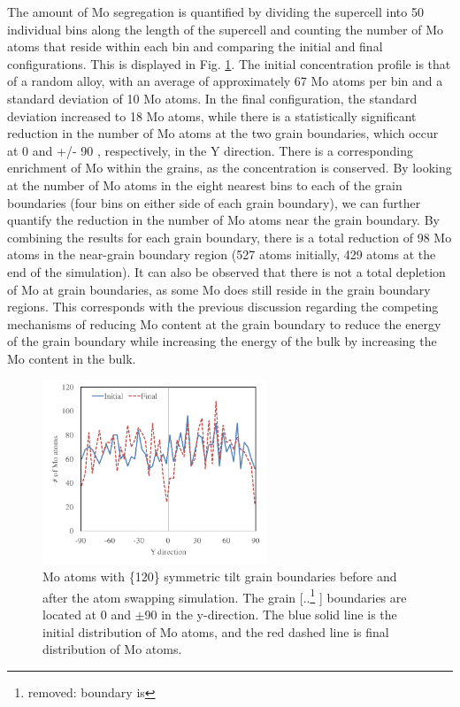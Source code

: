 \documentclass[review]{elsarticle}
\providecommand{\DIFaddtex}[1]{{\protect\color{blue} \sf #1}} %
\providecommand{\DIFdeltex}[1]{{\protect\color{red} [..\footnote{removed: #1} ]}} %
\providecommand{\DIFaddbegin}{} %
\providecommand{\DIFaddend}{} %
\providecommand{\DIFaddFL}[1]{\DIFadd{#1}} %
\providecommand{\DIFdelFL}[1]{\DIFdel{#1}} %
\providecommand{\DIFaddbeginFL}{} %
\providecommand{\DIFaddendFL}{} %
\providecommand{\DIFdelbeginFL}{} %
\providecommand{\DIFdelendFL}{} %
\providecommand{\DIFadd}[1]{\texorpdfstring{\DIFaddtex{#1}}{#1}} %
\providecommand{\DIFdel}[1]{\texorpdfstring{\DIFdeltex{#1}}{}} %
\newcommand{\DIFscaledelfig}{0.5}
\newlength{\DIFdelgraphicswidth} %
\newlength{\DIFdelgraphicsheight} %
\newcommand{\DIFaddincludegraphics}[2][]{{\color{blue}\fbox{\DIFOincludegraphics[#1]{#2}}}} %
\newcommand{\DIFdelincludegraphics}[2][]{%
\sbox{\DIFdelgraphicsbox}{\DIFOincludegraphics[#1]{#2}}%
\settoboxwidth{\DIFdelgraphicswidth}{\DIFdelgraphicsbox} %
\settoboxtotalheight{\DIFdelgraphicsheight}{\DIFdelgraphicsbox} %
\scalebox{\DIFscaledelfig}{%
\parbox[b]{\DIFdelgraphicswidth}{\usebox{\DIFdelgraphicsbox}\\[-\baselineskip] \rule{\DIFdelgraphicswidth}{0em}}\llap{\resizebox{\DIFdelgraphicswidth}{\DIFdelgraphicsheight}{%
\setlength{\unitlength}{\DIFdelgraphicswidth}%
\begin{picture}(1,1)%
\thicklines\linethickness{2pt} %
{\color[rgb]{1,0,0}\put(0,0){\framebox(1,1){}}}%
{\color[rgb]{1,0,0}\put(0,0){\line( 1,1){1}}}%
{\color[rgb]{1,0,0}\put(0,1){\line(1,-1){1}}}%
\end{picture}%
}\hspace*{3pt}}} %
} %
\DeclareRobustCommand{\DIFaddbegin}{\DIFOaddbegin \let\includegraphics\DIFaddincludegraphics} %
\DeclareRobustCommand{\DIFaddend}{\DIFOaddend \let\includegraphics\DIFOincludegraphics} %
\DeclareRobustCommand{\DIFaddbeginFL}{\DIFOaddbeginFL \let\includegraphics\DIFaddincludegraphics} %
\DeclareRobustCommand{\DIFaddendFL}{\DIFOaddendFL \let\includegraphics\DIFOincludegraphics} %
\DeclareRobustCommand{\DIFdelbeginFL}{\DIFOdelbeginFL \let\includegraphics\DIFdelincludegraphics} %
\DeclareRobustCommand{\DIFdelendFL}{\DIFOaddendFL \let\includegraphics\DIFOincludegraphics} %
\begin{document}
The amount of Mo segregation is quantified by dividing the supercell into 50 individual bins along the length of the supercell and counting the number of Mo atoms that reside within each bin and comparing the initial and final configurations. This is displayed in Fig. \ref{fig:600mcmdA}. The initial concentration profile is that of a random alloy, with an average of approximately 67 Mo atoms per bin and a standard deviation of 10 Mo atoms. In the final configuration, the standard deviation increased to 18 Mo atoms, while there is a statistically significant reduction in the number of Mo atoms at the \DIFaddbegin \DIFadd{two }\DIFaddend grain boundaries, which occur at 0 and +/- 90\DIFaddbegin \DIFadd{, respectively, }\DIFaddend in the Y direction. There is a corresponding enrichment of Mo within the grains, as the concentration is conserved. By looking at the number of Mo atoms in the eight nearest bins to each of the grain boundaries (four bins on either side of each grain boundary), we can further quantify the reduction in the number of Mo atoms near the grain boundary. By combining the results for each grain boundary, there is a total reduction of 98 Mo atoms in the near-grain boundary region (527 atoms initially, 429 atoms at the end of the simulation). It can also be observed that there is not a total depletion of Mo at grain boundaries, as some Mo does still reside in the grain boundary regions. This corresponds with the previous discussion regarding the competing mechanisms of reducing Mo content at the grain boundary to reduce the energy of the grain boundary while increasing the energy of the bulk by increasing the Mo content in the bulk.

\begin{figure}[h]
 \centering
 \includegraphics[width=0.6\textwidth]{600mcmdA.png} 
 \caption{Mo atoms with \{120\} symmetric tilt grain boundaries before and after the atom swapping simulation. The grain \DIFdelbeginFL \DIFdelFL{boundary is }\DIFdelendFL \DIFaddbeginFL \DIFaddFL{boundaries are }\DIFaddendFL located at 0 and $\pm$90 in the y-direction. The blue solid line is the initial distribution of Mo atoms, and the red dashed line is final distribution of Mo atoms.}
 \label{fig:600mcmdA}
\end{figure}
\end{document}
